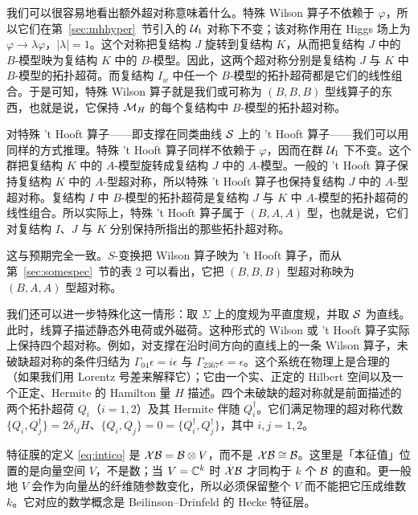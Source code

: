 我们可以很容易地看出额外超对称意味着什么。特殊 Wilson 算子不依赖于 $\varphi$，所以它们在第~\ref{sec:mhhyper}~节引入的 ${\cal U}_1$ 对称下不变；该对称作用在 Higgs 场上为 $\varphi\to\lambda\varphi$，$|\lambda|=1$。这个对称把复结构 $J$ 旋转到复结构 $K$，从而把复结构 $J$ 中的 $B$-模型映为复结构 $K$ 中的 $B$-模型。因此，这两个超对称分别是复结构 $J$ 与 $K$ 中 $B$-模型的拓扑超荷。而复结构 $I_w$ 中任一个 $B$-模型的拓扑超荷都是它们的线性组合。于是可知，特殊 Wilson 算子就是我们或可称为 $(B,B,B)$ 型线算子的东西，也就是说，它保持 $\MH$ 的每个复结构中 $B$-模型的拓扑超对称。

对特殊 't Hooft 算子——即支撑在同类曲线 ${{\cal S}}$ 上的 't Hooft 算子——我们可以用同样的方式推理。特殊 't Hooft 算子同样不依赖于 $\varphi$，因而在群 ${\cal U}_1$ 下不变。这个群把复结构 $K$ 中的 $A$-模型旋转成复结构 $J$ 中的 $A$-模型。一般的 't Hooft 算子保持复结构 $K$ 中的 $A$-型超对称，所以特殊 't Hooft 算子也保持复结构 $J$ 中的 $A$-型超对称。复结构 $I$ 中 $B$-模型的拓扑超荷是复结构 $J$ 与 $K$ 中 $A$-模型的拓扑超荷的线性组合。所以实际上，特殊 't Hooft 算子属于 $(B,A,A)$ 型，也就是说，它们对复结构 $I$、$J$ 与 $K$ 分别保持所指出的那些拓扑超对称。

这与预期完全一致。$S$-变换把 Wilson 算子映为 't Hooft 算子，而从第~\ref{sec:somespec}~节的表 2 可以看出，它把 $(B,B,B)$ 型超对称映为 $(B,A,A)$ 型超对称。

我们还可以进一步特殊化这一情形：取 $\Sigma$ 上的度规为平直度规，并取 ${{\cal S}}$ 为直线。此时，线算子描述静态外电荷或外磁荷。这种形式的 Wilson 或 't Hooft 算子实际上保持四个超对称。例如，对支撑在沿时间方向的直线上的一条 Wilson 算子，未破缺超对称的条件归结为 $\Gamma_{04}\epsilon=i\epsilon$ 与 $\Gamma_{2367}\epsilon=\epsilon$。这个系统在物理上是合理的（如果我们用 Lorentz 号差来解释它）；它由一个实、正定的 Hilbert 空间以及一个正定、Hermite 的 Hamilton 量 $H$ 描述。四个未破缺的超对称就是前面描述的两个拓扑超荷 $Q_i$（$i=1,2$）及其 Hermite 伴随 $Q^\dagger_i$。它们满足物理的超对称代数 $\{Q_i,Q^\dagger_j\}=2\delta_{ij}H$、$\{Q_i,Q_j\}=0=\{Q^\dagger_i,Q^\dagger_j\}$，其中 $i,j=1,2$。

\begin{yizhu}[易错点]
特征膜的定义 \eqref{eq:intico} 是 $\EUX{\cal B}={\cal B}\otimes V$，而不是 $\EUX{\cal B}\cong{\cal B}$。这里是「本征值」位置的是向量空间 $V$，不是数；当 $V=\Bbb{C}^k$ 时 $\EUX{\cal B}$ 才同构于 $k$ 个 ${\cal B}$ 的直和。更一般地 $V$ 会作为向量丛的纤维随参数变化，所以必须保留整个 $V$ 而不能把它压成维数 $k$。它对应的数学概念是 Beilinson–Drinfeld 的 Hecke 特征层。
\end{yizhu}

